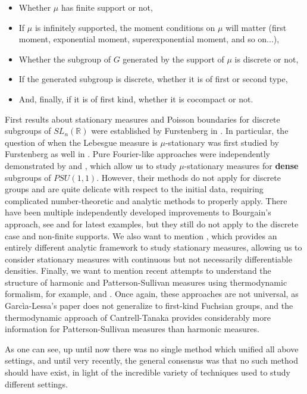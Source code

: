 \documentclass[11pt]{article}
\begin{document}
\begin{itemize}
	\item Whether $\mu$ has finite support or not,
	\item If $\mu$ is infinitely supported, the moment conditions on $\mu$ will matter (first moment, exponential moment, superexponential moment, and so on...),
	\item Whether the subgroup of $G$ generated by the support of $\mu$ is discrete or not,
	\item If the generated subgroup is discrete, whether it is of first or second type,
	\item And, finally, if it is of first kind, whether it is cocompact or not.
\end{itemize}

First results about stationary measures and Poisson boundaries for discrete subgroups of $SL_n(\mathbb{R})$ were established by Furstenberg in \cite{furstenberg1963noncommuting}. In particular, the question of when the Lebesgue measure is $\mu$-stationary was first studied by Furstenberg as well in \cite{furstenberg71}. Pure Fourier-like approaches were independently demonstrated by \cite{Bourgain2012} and \cite{MR2969625}, which allow us to study $\mu$-stationary measures for \textbf{dense} subgroups of $PSU(1,1)$. However, their methods do not apply for discrete groups and are quite delicate with respect to the initial data, requiring complicated number-theoretic and analytic methods to properly apply. There have been multiple independently developed improvements to Bourgain's approach, see \cite{lequen2022absolutely} and \cite{kogler2022locallimittheoremrandom} for latest examples, but they still do not apply to the discrete case and non-finite supports. We also want to mention \cite{kittle2023absolutely}, which provides an entirely different analytic framework to study stationary measures, allowing us to consider stationary measures with continuous but not necessarily differentiable densities. Finally, we want to mention recent attempts to understand the structure of harmonic and Patterson-Sullivan measures using thermodynamic formalism, for example, \cite{garcía2023dimension} and \cite{cantrell2022invariant}. Once again, these approaches are not universal, as Garc\`{i}a-Lessa's paper does not generalize to first-kind Fuchsian groups, and the thermodynamic approach of Cantrell-Tanaka provides considerably more information for Patterson-Sullivan measures than harmonic measures.

As one can see, up until now there was no single method which unified all above settings, and until very recently, the general consensus was that no such method should have exist, in light of the incredible variety of techniques used to study different settings. 
\end{document}
